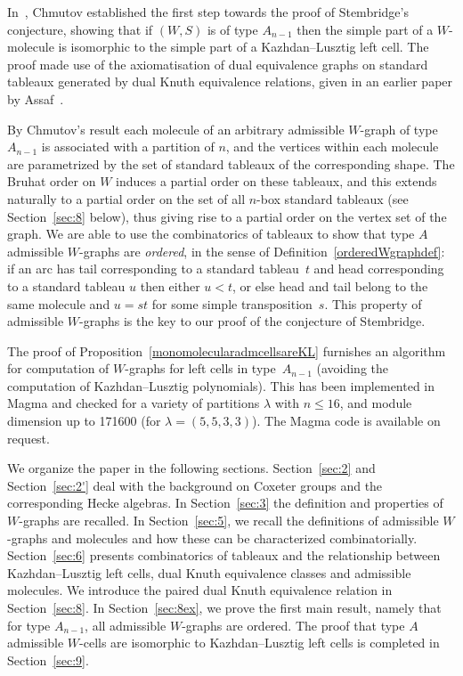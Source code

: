 \documentclass[ALCO,ThmDefs,Unicode,epreuves]{cedram}
\begin{document}
In~\cite{ChuMic:typeAMol}, Chmutov established the first step towards
the proof of Stembridge's conjecture, showing that if $(W,S)$ is of
type $A_{n-1}$ then the simple part of a $W\!$-molecule is isomorphic
to the simple part of a Kazhdan--Lusztig left cell. The proof made use of the
axiomatisation of dual equivalence graphs on standard tableaux generated
by dual Knuth equivalence relations, given in an earlier paper by
Assaf~\cite{assaf:dualequigraphs}.

By Chmutov's result each molecule of an arbitrary admissible $W\!$-graph of
type~$A_{n-1}$ is associated with a partition of $n$, and the vertices
within each molecule are parametrized by the set of standard tableaux of
the corresponding shape. The Bruhat order on $W$ induces a partial order on
these tableaux, and this extends naturally to a partial order on the set of all
$n$-box standard tableaux (see Section~\ref{sec:8} below), thus giving rise
to a partial order on the vertex set of the graph. We are able to use the
combinatorics of tableaux to show that type $A$ admissible $W\!$-graphs
are \emph{ordered}, in the sense of Definition~\ref{orderedWgraphdef}: if an
arc has tail corresponding to a standard tableau~$t$ and head corresponding
to a standard tableau $u$ then either $u<t$, or else head and tail
belong to the same molecule and $u=st$ for some simple transposition~$s$.
This property of admissible $W\!$-graphs is the key to our proof of the
conjecture of Stembridge.

The proof of Proposition~\ref{monomolecularadmcellsareKL} furnishes an
algorithm for computation of $W\!$-graphs for left cells in type~$A_{n-1}$
(avoiding the computation of Kazhdan--Lusztig polynomials). This has been
implemented in Magma and checked for a variety of partitions $\lambda$
with $n\le 16$, and module dimension up to 171600 (for $\lambda=(5,5,3,3)$).
The Magma code is available on request.

We organize the paper in the following sections. Section~\ref{sec:2} and
Section~\ref{sec:2'} deal
with the background on Coxeter groups and the corresponding Hecke algebras.
In Section~\ref{sec:3} the definition and properties of $W\!$-graphs are
recalled.
In Section~\ref{sec:5}, we recall the definitions of admissible $W\!$-graphs
and molecules and how these can be characterized combinatorially.
Section~\ref{sec:6} presents combinatorics of tableaux and the relationship
between Kazhdan--Lusztig left cells, dual Knuth equivalence classes and
admissible molecules. We introduce the
paired dual Knuth equivalence relation in Section~\ref{sec:8}. In
Section~\ref{sec:8ex}, we prove the first main result, namely that for
type $A_{n-1}$, all admissible $W\!$-graphs are ordered. The proof that
type $A$ admissible $W\!$-cells are isomorphic to Kazhdan--Lusztig left
cells is completed in Section~\ref{sec:9}.
\end{document}
